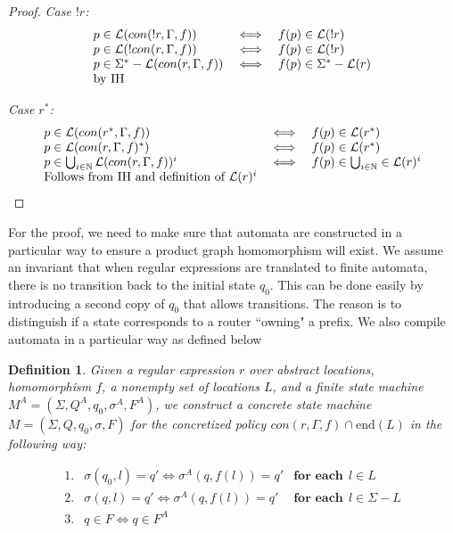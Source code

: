 \documentclass[twocolumn, openany]{sig-alternate-10pt}
\newcommand{\EndR}{\ensuremath{\mathrm{end}}}
\newtheorem{defn}{Definition}
\begin{document}
\begin{proof}
\emph{Case $!r$:}
  \[ \begin{array}{lll}
    p \in \mathcal{L}(con(!r,\Gamma,f)) &\iff& f(p) \in \mathcal{L}(!r) \\
    p \in \mathcal{L}(!con(r,\Gamma,f)) &\iff& f(p) \in \mathcal{L}(!r) \\
    p \in \Sigma^* - \mathcal{L}(con(r,\Gamma,f)) &\iff& f(p) \in \Sigma^* - \mathcal{L}(r) \\
    \text{by IH} & & \\
  \end{array} \]

\emph{Case $r^*$:}
  \[ \begin{array}{lll}
    p \in \mathcal{L}(con(r^*,\Gamma,f)) &\iff& f(p) \in \mathcal{L}(r^*) \\
    p \in \mathcal{L}(con(r,\Gamma,f)^*) &\iff& f(p) \in \mathcal{L}(r^*) \\
    p \in \bigcup_{i \in \mathbb{N}} \mathcal{L}(con(r,\Gamma,f))^i &\iff& f(p) \in \bigcup_{i \in \mathbb{N}} \in \mathcal{L}(r)^i \\
    \text{Follows from IH and definition of } \mathcal{L}(r)^i & & \\
  \end{array} \]

\end{proof}



\vspace{1em}
For the proof, we need to make sure that automata are constructed in a particular way to ensure a product graph homomorphism will exist. We assume an invariant that when regular expressions are translated to finite automata, there is no transition back to the initial state $q_0$. This can be done easily by introducing a second copy of $q_0$ that allows transitions. The reason is to distinguish if a state corresponds to a router ``owning" a prefix. We also compile automata in a particular way as defined below

\begin{defn}
Given a regular expression $r$ over abstract locations, homomorphism $f$, a nonempty set of locations $L$, and a finite state machine $M^A = (\Sigma,Q^A,q_0,\sigma^A,F^A)$, we construct a concrete state machine $M = (\Sigma, Q, q_0, \sigma, F)$ for the concretized policy $con(r,\Gamma, f) \cap \EndR(L)$ in the following way: 

    \[ \begin{array}{lll}
      1. & \sigma(q_0,l) = q' \iff \sigma^A(q,f(l)) = q' & \textbf{for each}~~ l \in L \\
      2. & \sigma(q,l) = q' \iff \sigma^A(q,f(l)) = q' & \textbf{for each}~~ l \in \Sigma - L \\
      3. & q \in F \iff q \in F^A & \\
    \end{array} \]
\end{defn}
\end{document}
